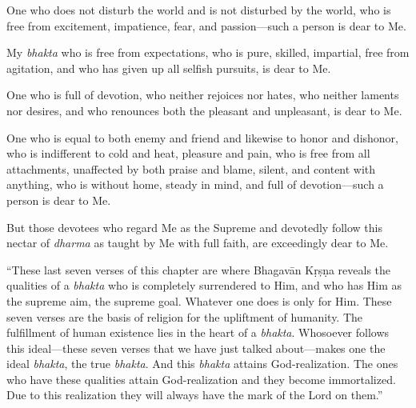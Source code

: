 {One who does not disturb the world and is not disturbed by the world, who is free from excitement, impatience, fear, and passion---such a person is dear to Me.}

{My \textit{bhakta} who is free from expectations, who is pure, skilled, impartial, free from agitation, and who has given up all selfish pursuits, is dear to Me.}

{One who is full of devotion, who neither rejoices nor hates, who neither laments nor desires, and who renounces both the pleasant and unpleasant, is dear to Me.}

{One who is equal to both enemy and friend and likewise to honor and dishonor, who is indifferent to cold and heat, pleasure and pain, who is free from all attachments, unaffected by both praise and blame, silent, and content with anything, who is without home, steady in mind, and full of devotion---such a person is dear to Me.}

{But those devotees who regard Me as the Supreme and devotedly follow this nectar of \textit{dharma} as taught by Me with full faith, are exceedingly dear to Me.}

\enquote{These last seven verses of this chapter are where Bhagavān Kṛṣṇa reveals the qualities of a \textit{bhakta} who is completely surrendered to Him, and who has Him as the supreme aim, the supreme goal. Whatever one does is only for Him. These seven verses are the basis of religion for the upliftment of humanity. The fulfillment of human existence lies in the heart of a \textit{bhakta}. Whosoever follows this ideal---these seven verses that we have just talked about---makes one the ideal \textit{bhakta}, the true \textit{bhakta}. And this \textit{bhakta} attains God-realization. The ones who have these qualities attain God-realization and they become immortalized. Due to this realization they will always have the mark of the Lord on them.}

